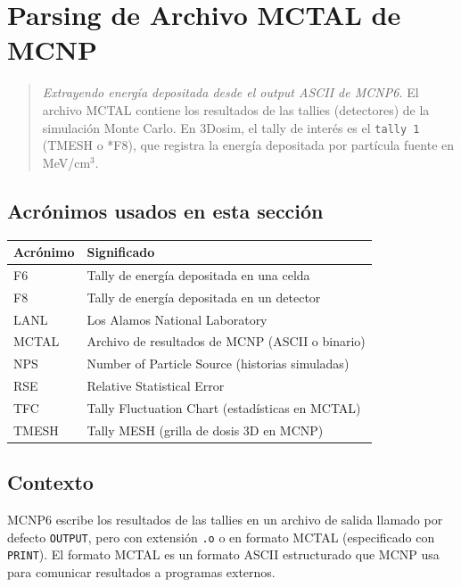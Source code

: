 \documentclass[12pt,a4paper]{article}
\begin{document}
\begin{tcolorbox}[aiSupervisor]
\newpage

\end{tcolorbox}
\section{Parsing de Archivo MCTAL de MCNP}

\begin{quote}
\textit{Extrayendo energía depositada desde el output ASCII de MCNP6.} El archivo MCTAL contiene los resultados de las tallies (detectores) de la simulación Monte Carlo. En 3Dosim, el tally de interés es el \texttt{tally 1} (TMESH o *F8), que registra la energía depositada por partícula fuente en MeV/cm$^3$.
\end{quote}

\subsection*{Acrónimos usados en esta sección}

\begin{tabular}{p{3cm} p{12cm}}
\toprule
\textbf{Acrónimo} & \textbf{Significado} \\
\midrule
F6 & Tally de energía depositada en una celda \\
F8 & Tally de energía depositada en un detector \\
LANL & Los Alamos National Laboratory \\
MCTAL & Archivo de resultados de MCNP (ASCII o binario) \\
NPS & Number of Particle Source (historias simuladas) \\
RSE & Relative Statistical Error \\
TFC & Tally Fluctuation Chart (estadísticas en MCTAL) \\
TMESH & Tally MESH (grilla de dosis 3D en MCNP) \\
\bottomrule
\end{tabular}

\subsection{Contexto}

MCNP6 escribe los resultados de las tallies en un archivo de salida llamado por defecto \texttt{OUTPUT}, pero con extensión \texttt{.o} o en formato MCTAL (especificado con \texttt{PRINT}). El formato MCTAL es un formato ASCII estructurado que MCNP usa para comunicar resultados a programas externos.
\end{document}
